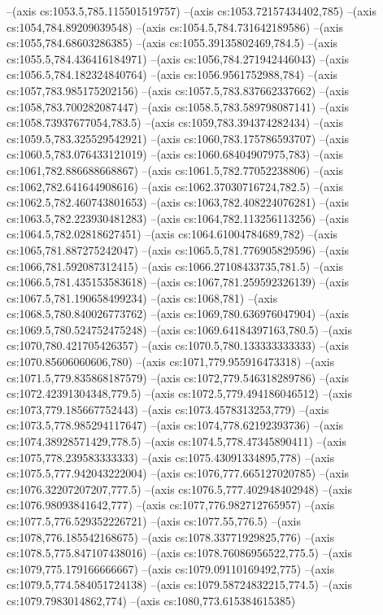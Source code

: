 --(axis cs:1053.5,785.115501519757)
--(axis cs:1053.72157434402,785)
--(axis cs:1054,784.89209039548)
--(axis cs:1054.5,784.731642189586)
--(axis cs:1055,784.68603286385)
--(axis cs:1055.39135802469,784.5)
--(axis cs:1055.5,784.436416184971)
--(axis cs:1056,784.271942446043)
--(axis cs:1056.5,784.182324840764)
--(axis cs:1056.9561752988,784)
--(axis cs:1057,783.985175202156)
--(axis cs:1057.5,783.837662337662)
--(axis cs:1058,783.700282087447)
--(axis cs:1058.5,783.589798087141)
--(axis cs:1058.73937677054,783.5)
--(axis cs:1059,783.394374282434)
--(axis cs:1059.5,783.325529542921)
--(axis cs:1060,783.175786593707)
--(axis cs:1060.5,783.076433121019)
--(axis cs:1060.68404907975,783)
--(axis cs:1061,782.886688668867)
--(axis cs:1061.5,782.77052238806)
--(axis cs:1062,782.641644908616)
--(axis cs:1062.37030716724,782.5)
--(axis cs:1062.5,782.460743801653)
--(axis cs:1063,782.408224076281)
--(axis cs:1063.5,782.223930481283)
--(axis cs:1064,782.113256113256)
--(axis cs:1064.5,782.02818627451)
--(axis cs:1064.61004784689,782)
--(axis cs:1065,781.887275242047)
--(axis cs:1065.5,781.776905829596)
--(axis cs:1066,781.592087312415)
--(axis cs:1066.27108433735,781.5)
--(axis cs:1066.5,781.435153583618)
--(axis cs:1067,781.259592326139)
--(axis cs:1067.5,781.190658499234)
--(axis cs:1068,781)
--(axis cs:1068.5,780.840026773762)
--(axis cs:1069,780.636976047904)
--(axis cs:1069.5,780.524752475248)
--(axis cs:1069.64184397163,780.5)
--(axis cs:1070,780.421705426357)
--(axis cs:1070.5,780.133333333333)
--(axis cs:1070.85606060606,780)
--(axis cs:1071,779.955916473318)
--(axis cs:1071.5,779.835868187579)
--(axis cs:1072,779.546318289786)
--(axis cs:1072.42391304348,779.5)
--(axis cs:1072.5,779.494186046512)
--(axis cs:1073,779.185667752443)
--(axis cs:1073.4578313253,779)
--(axis cs:1073.5,778.985294117647)
--(axis cs:1074,778.62192393736)
--(axis cs:1074.38928571429,778.5)
--(axis cs:1074.5,778.47345890411)
--(axis cs:1075,778.239583333333)
--(axis cs:1075.43091334895,778)
--(axis cs:1075.5,777.942043222004)
--(axis cs:1076,777.665127020785)
--(axis cs:1076.32207207207,777.5)
--(axis cs:1076.5,777.402948402948)
--(axis cs:1076.98093841642,777)
--(axis cs:1077,776.982712765957)
--(axis cs:1077.5,776.529352226721)
--(axis cs:1077.55,776.5)
--(axis cs:1078,776.185542168675)
--(axis cs:1078.33771929825,776)
--(axis cs:1078.5,775.847107438016)
--(axis cs:1078.76086956522,775.5)
--(axis cs:1079,775.179166666667)
--(axis cs:1079.09110169492,775)
--(axis cs:1079.5,774.584051724138)
--(axis cs:1079.58724832215,774.5)
--(axis cs:1079.7983014862,774)
--(axis cs:1080,773.615384615385)
